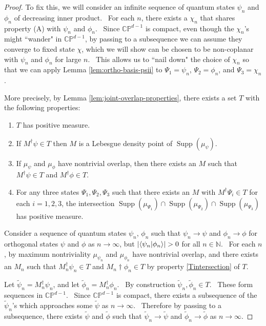 \documentclass[letterpaper,12pt]{article}
\newcommand{\braket}[2]{\mbox{$ \langle #1 | #2 \rangle $}}
\DeclareMathOperator{\supp}{Supp}
\begin{document}
\begin{proof}
To fix this, we will consider an infinite sequence of quantum states $\psi_n$ and $\phi_n$ of decreasing inner product. \ For each $n$, there exists a $\chi_n$ that shares property (A) with $\psi_n$ and $\phi_n$. \ Since $\mathbb{CP}^{d-1}$ is compact, even though the $\chi_n$'s might ``wander" in $\mathbb{CP}^{d-1}$, by passing to a subsequence we can assume they converge to fixed state $\chi$, which we will show can be chosen to be non-coplanar with $\psi_n$ and $\phi_n$ for large $n$. \ This allows us to ``nail down" the choice of $\chi_n$ so that we can apply Lemma \ref{lem:ortho-basis-psii} to $\Psi_1=\psi_n$, $\Psi_2=\phi_n$, and $\Psi_3=\chi_n$.

More precisely, by Lemma \ref{lem:joint-overlap-properties}, there exists a set $T$ with the following properties:
\begin{enumerate}
\item $T$ has positive measure.
\item If $M^\dagger \psi \in T$ then $M$ is a Lebesgue density point of $\supp(\mu_\psi)$.
\item If $\mu_\psi$ and $\mu_\phi$ have nontrivial overlap, then there exists an $M$ such that $M^\dagger \psi \in T$ and $M^\dagger \phi \in T$.
\item For any three states $\Psi_1,\Psi_2,\Psi_3$ such that there exists an $M$ with $M^\dagger \Psi_i \in T$ for each $i=1,2,3$, the intersection $\supp(\mu_{\Psi_1}) \cap \supp(\mu_{\Psi_2}) \cap \supp(\mu_{\Psi_3})$ has positive measure.
\end{enumerate}
Consider a sequence of quantum states $\psi_n$, $\phi_n$ such that $\psi_n \rightarrow \psi$ and $\phi_n \rightarrow \phi$ for orthogonal states $\psi$ and $\phi$ as $n\rightarrow \infty$, but $|\braket{\psi_n}{\phi_n}|>0$ for all $n\in\mathbb{N}$. \ For each $n$, by maximum nontriviality $\mu_{\psi_n}$ and $\mu_{\phi_n}$ have nontrivial overlap, and there exists an $M_n$ such that $M_n^\dagger \psi_n \in T$ and $M_n\dagger \phi_n \in T$ by property \ref{Tintersection} of $T$.

Let $\tilde{\psi}_n = M_n^\dagger \psi_n$, and let $\tilde{\phi}_n =M_n^\dagger \phi_n$. \ By construction $\tilde{\psi}_n, \tilde{\phi}_n \in T$. \ These form sequences in $\mathbb{CP}^{d-1}$. \ Since $\mathbb{CP}^{d-1}$ is compact, there exists a subsequence of the $\tilde{\psi}_n$'s which approaches some $\tilde{\psi}$ as $n\rightarrow \infty$. \ Therefore by passing to a subsequence, there exists $\tilde{\psi}$ and $\tilde{\phi}$ such that $\tilde{\psi}_n \rightarrow \tilde{\psi}$ and $\tilde{\phi}_n \rightarrow \tilde{\phi}$ as $n\rightarrow \infty$.


\end{proof}
\end{document}
